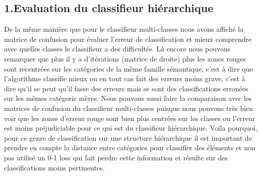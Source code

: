 \documentclass[a4paper,11pt]{report}
\begin{document}
\subsection*{1.Evaluation du classifieur hiérarchique}
De la même manière que pour le classifieur multi-classes nous avons affiché la matrice de confusion pour évaluer l'erreur de classification et mieux comprendre avec quelles classes le classifieur a des difficultés. Là encore nous pouvons remarquer que plus il y a d'itérations (matrice de droite) plus les zones rouges sont recentrées sur les catégories de la même famille sémantique, c'est à dire que l'algorithme classifie mieux ou en tout cas fait des erreurs moins grave, c'est à dire qu'il se peut qu'il fasse des erreurs mais se sont des classifications erronées sur les mêmes catégorie mères. Nous pouvons aussi faire la comparaison avec les matrices de confusion du classifieur multi-classes puisque nous pouvons très bien voir que les zones d'erreur rouge sont bien plus centrées sur les classes ou l'erreur est moins préjudiciable pour ce qui est du classifieur hiérarchique. Voila pourquoi, pour ce genre de classification sur une structure hiérarchique il est important de prendre en compte la distance entre catégories pour classifier des éléments et non pas utilisé un 0-1 loss qui fait perdre cette information et résulte sur des classifications moins pertinentes.\\\\
\end{document}
